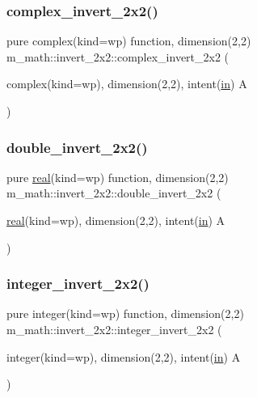 \subsubsection{\texorpdfstring{complex\+\_\+invert\+\_\+2x2()}{complex\_invert\_2x2()}}
{\footnotesize\ttfamily pure complex(kind=wp) function, dimension(2,2) m\+\_\+math\+::invert\+\_\+2x2\+::complex\+\_\+invert\+\_\+2x2 (\begin{DoxyParamCaption}\item[{complex(kind=wp), dimension(2,2), intent(\hyperlink{M__journal_83_8txt_afce72651d1eed785a2132bee863b2f38}{in})}]{A }\end{DoxyParamCaption})\hspace{0.3cm}{\ttfamily [private]}}

\mbox{\label{interfacem__math_1_1invert__2x2_ac3a74a1e772db1ab6d55d7f950d9cd63}} 
\subsubsection{\texorpdfstring{double\+\_\+invert\+\_\+2x2()}{double\_invert\_2x2()}}
{\footnotesize\ttfamily pure \hyperlink{read__watch_83_8txt_abdb62bde002f38ef75f810d3a905a823}{real}(kind=wp) function, dimension(2,2) m\+\_\+math\+::invert\+\_\+2x2\+::double\+\_\+invert\+\_\+2x2 (\begin{DoxyParamCaption}\item[{\hyperlink{read__watch_83_8txt_abdb62bde002f38ef75f810d3a905a823}{real}(kind=wp), dimension(2,2), intent(\hyperlink{M__journal_83_8txt_afce72651d1eed785a2132bee863b2f38}{in})}]{A }\end{DoxyParamCaption})\hspace{0.3cm}{\ttfamily [private]}}

\mbox{\label{interfacem__math_1_1invert__2x2_ae78383e51ec51bc8d12123e197804c3c}} 
\subsubsection{\texorpdfstring{integer\+\_\+invert\+\_\+2x2()}{integer\_invert\_2x2()}}
{\footnotesize\ttfamily pure integer(kind=wp) function, dimension(2,2) m\+\_\+math\+::invert\+\_\+2x2\+::integer\+\_\+invert\+\_\+2x2 (\begin{DoxyParamCaption}\item[{integer(kind=wp), dimension(2,2), intent(\hyperlink{M__journal_83_8txt_afce72651d1eed785a2132bee863b2f38}{in})}]{A }\end{DoxyParamCaption})\hspace{0.3cm}{\ttfamily [private]}}

